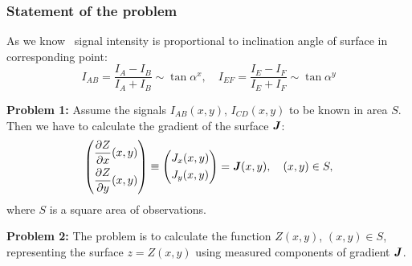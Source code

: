 \documentclass{beamer}
\begin{document}
\begin{frame}[allowframebreaks]
    \frametitle{Statement of the problem}
    As we know~\cite{PaluszynskiSlowko2005Vacuum, DrzazgaPaluszynski2005Measurement} signal
    intensity is proportional to inclination angle of surface in corresponding point:
    $$ I_{AB} = \frac{I_A - I_B}{I_A + I_B} \sim \tan{\alpha^x}, \quad I_{EF} = \frac{I_E - I_F}{I_E + I_F} \sim \tan{\alpha^y} $$


    \textbf{Problem 1:} Assume the signals $I_{AB}(x,y)$, $I_{CD}(x,y)$ to be known in area $S$.
    Then we have to calculate the gradient of the surface ${\textbf{\emph{J}}}$:
    \begin{equation}
        \label{problem_statement}
        \left(
        \begin{aligned}
            &\frac{\partial Z}{\partial x} (x,y)\\
            &\frac{\partial Z}{\partial y} (x,y)
        \end{aligned}
        \right)
        \equiv
        \left(
        \begin{aligned}
            &J_x (x,y)\\
            &J_y (x,y)
        \end{aligned}
        \right)
        = {\textbf{\emph{J}}}(x,y)
        , \quad (x,y) \in S,
    \end{equation}
    where $S$ is a square area of observations.

    \vfill

    \textbf{Problem 2:}
    The problem is to calculate the function $Z(x,y)$, $(x,y) \in S$,
    representing the surface $z = Z(x,y)$ using measured components of gradient ${\textbf{\emph{J}}}$.

\end{frame}
\end{document}
